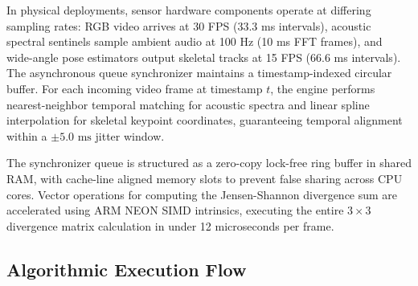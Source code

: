 \documentclass[conference]{IEEEtran}
\begin{document}
In physical deployments, sensor hardware components operate at differing sampling rates: RGB video arrives at 30 FPS (33.3 ms intervals), acoustic spectral sentinels sample ambient audio at 100 Hz (10 ms FFT frames), and wide-angle pose estimators output skeletal tracks at 15 FPS (66.6 ms intervals). The asynchronous queue synchronizer maintains a timestamp-indexed circular buffer. For each incoming video frame at timestamp $t$, the engine performs nearest-neighbor temporal matching for acoustic spectra and linear spline interpolation for skeletal keypoint coordinates, guaranteeing temporal alignment within a $\pm 5.0\text{ ms}$ jitter window.

The synchronizer queue is structured as a zero-copy lock-free ring buffer in shared RAM, with cache-line aligned memory slots to prevent false sharing across CPU cores. Vector operations for computing the Jensen-Shannon divergence sum are accelerated using ARM NEON SIMD intrinsics, executing the entire $3 \times 3$ divergence matrix calculation in under 12 microseconds per frame.

\subsection{Algorithmic Execution Flow}
\begin{center}
\end{center}
\end{document}
